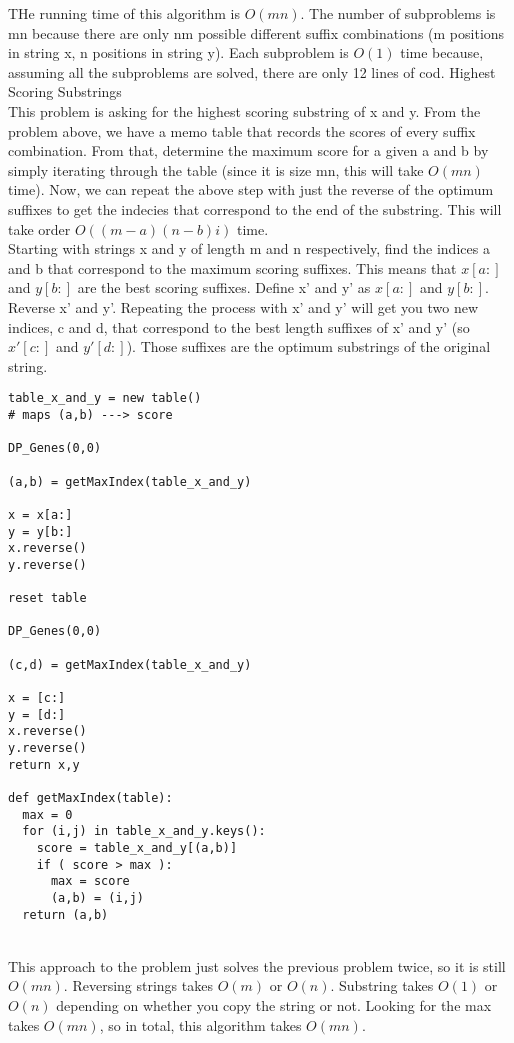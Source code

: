 \documentclass[12pt,twoside]{article}
\begin{document}
\begin{problems}
\begin{problemparts}
THe running time of this algorithm is $O(mn)$.  The number of subproblems is mn because there are only nm possible different suffix combinations (m  positions in string x, n positions in string y).  Each subproblem is $O(1)$ time because, assuming all the subproblems are solved, there are only 12 lines of cod.
\problempart Highest Scoring Substrings\\
This problem is asking for the highest scoring substring of x and y.  From the problem above, we have a memo table that records the scores of every suffix combination.  From that, determine the maximum score for a given a and b by simply iterating through the table (since it is size mn, this will take $O(mn)$ time). Now, we can repeat the above step with just the reverse of the optimum suffixes to get the indecies that correspond to the end of the substring.  This will take order $O( (m-a) (n-b)i )$ time. \\

Starting with strings x and y of length m and n respectively, find the indices a and b that correspond to the maximum scoring suffixes.  This means that $x[a:]$ and $y[b:]$ are the best scoring suffixes.  Define x' and y' as $x[a:]$ and $y[b:]$.  Reverse x' and y'.  Repeating the process with x' and y' will get you two new indices, c and d, that correspond to the best length suffixes of x' and y' (so $x'[c:]$ and $y'[d:]$).  Those suffixes are the optimum substrings of the original string.\\

\begin{lstlisting}
table_x_and_y = new table()
# maps (a,b) ---> score

DP_Genes(0,0)

(a,b) = getMaxIndex(table_x_and_y)

x = x[a:]
y = y[b:]
x.reverse()
y.reverse()

reset table

DP_Genes(0,0)

(c,d) = getMaxIndex(table_x_and_y)

x = [c:]
y = [d:]
x.reverse()
y.reverse()
return x,y

def getMaxIndex(table):
  max = 0
  for (i,j) in table_x_and_y.keys():
    score = table_x_and_y[(a,b)]
    if ( score > max ):
      max = score
      (a,b) = (i,j)
  return (a,b)

\end{lstlisting}\\

This approach to the problem just solves the previous problem twice, so it is still $O(mn)$.  Reversing strings takes $O(m)$ or $O(n)$.  Substring takes $O(1)$ or $O(n)$ depending on whether you copy the string or not.  Looking for the max takes $O(mn)$, so in total, this algorithm takes $O(mn)$.   
\end{problemparts}
\end{problems}
\end{document}
